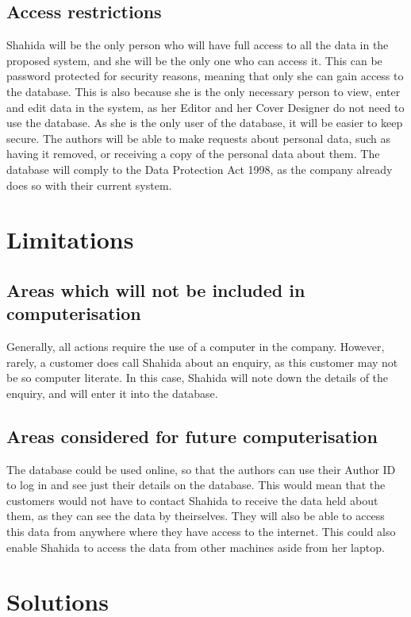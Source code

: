 \subsection{Access restrictions}

Shahida will be the only person who will have full access to all the data in the proposed system, and she will be the only one who can access it. This can be password protected for security reasons, meaning that only she can gain access to the database. This is also because she is the only necessary person to view, enter and edit data in the system, as her Editor and her Cover Designer do not need to use the database. As she is the only user of the database, it will be easier to keep secure. The authors will be able to make requests about personal data, such as having it removed, or receiving a copy of the personal data about them. The database will comply to the Data Protection Act 1998, as the company already does so with their current system.

\section{Limitations}

\subsection{Areas which will not be included in computerisation}
Generally, all actions require the use of a computer in the company. However, rarely, a customer does call Shahida about an enquiry, as this customer may not be so computer literate. In this case, Shahida will note down the details of the enquiry, and will enter it into the database.

\subsection{Areas considered for future computerisation}

The database could be used online, so that the authors can use their Author ID to log in and see just their details on the database. This would mean that the customers would not have to contact Shahida to receive the data held about them, as they can see the data by theirselves. They will also be able to access this data from anywhere where they have access to the internet. This could also enable Shahida to access the data from other machines aside from her laptop.

\section{Solutions}

